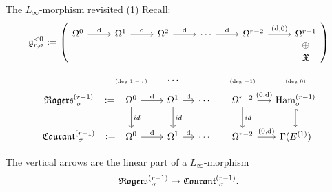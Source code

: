 \documentclass[beamer,10pt]{standalone}
\begin{document}
\begin{frame}{The \cite{Miti2024} $L_\infty$-morphism revisited (1)}
	Recall:
	\begin{displaymath}
		\g_{r,\sigma}^{<0} := \left(
		\begin{tikzcd}[ampersand replacement=\&]
			\Omega^0 \ar[r,"\d"]\&
			\Omega^1 \ar[r,"\d"]\&
			\Omega^2 \ar[r,"\d"]\&
			\cdots \ar[r,"\d"]\&
			\Omega^{r-2} \ar[r,"{(\d,0)}"]\&
			\Omega^{r-1}\ar[d,phantom,"\oplus"]\\[-.7em]
			\&\&\&\&\&\X
 		\end{tikzcd}
		\right)
	\end{displaymath}
	\vfill\pause

	\begin{displaymath}
		\begin{tikzcd}[ampersand replacement=\&,column sep = small]
			\& \text{\tiny (deg $1-r$)} \& \cdots \& \&\text{\tiny (deg $-1$)} \& \text{\tiny (deg $0$)} \\[-1.5em]
			\Rogers[\sigma]{r-1}   \ar[r,phantom,":="]
			\&
			\Omega^0 \ar[r,"{\d}"] \ar[d,"id"]
			\&
			\Omega^1 \ar[r,"{\d}"] \ar[d,"id"]
			\&
			\cdots
			\&
			\Omega^{r-2} \ar[r,"{(0,\d)}"] \ar[d,"id"]
			\& \Ham_{\sigma}^{(r-1)} \ar[d,hook]
			\\
			\Courant[\sigma]{r-1} \ar[r,phantom,":="]
			\&
			\Omega^0 \ar[r,"{\d}"]
			\&
			\Omega^1 \ar[r,"{\d}"] 
			\&
			\cdots
			\&
			\Omega^{r-2} \ar[r,"{(0,\d)}"]
			\& \Gamma(E^{(1)})
		\end{tikzcd}
	\end{displaymath}
	\vfill\pause

	\begin{thmblock}[{[M.-Zambon 2024]}]
		The vertical arrows are the linear part of a $L_\infty$-morphism $$\Rogers[\sigma]{r-1} \to \Courant[\sigma]{r-1}.$$
	\end{thmblock}
	\vfill
\end{frame}
\end{document}
